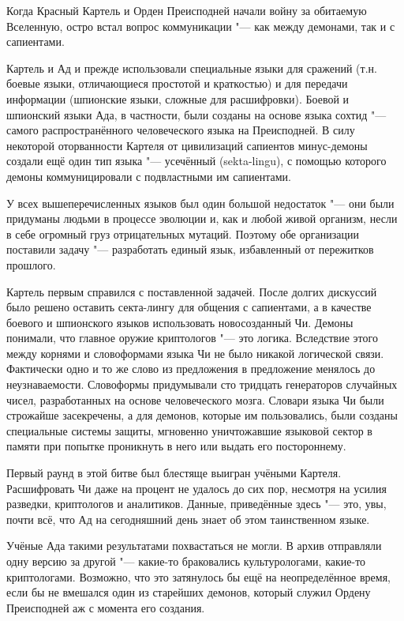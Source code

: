 Когда Красный Картель и Орден Преисподней начали войну за обитаемую Вселенную, остро встал вопрос коммуникации "--- как между демонами, так и с сапиентами.

Картель и Ад и прежде использовали специальные языки для сражений (т.н. боевые языки, отличающиеся простотой и краткостью) и для передачи информации (шпионские языки, сложные для расшифровки).
Боевой и шпионский языки Ада, в частности, были созданы на основе языка сохтид "--- самого распространённого человеческого языка на Преисподней.
В силу некоторой оторванности Картеля от цивилизаций сапиентов минус-демоны создали ещё один тип языка "--- усечённый (sekta-lingu), с помощью которого демоны коммуницировали с подвластными им сапиентами.

У всех вышеперечисленных языков был один большой недостаток "--- они были придуманы людьми в процессе эволюции и, как и любой живой организм, несли в себе огромный груз отрицательных мутаций.
Поэтому обе организации поставили задачу "--- разработать единый язык, избавленный от пережитков прошлого.

Картель первым справился с поставленной задачей.
После долгих дискуссий было решено оставить секта-лингу для общения с сапиентами, а в качестве боевого и шпионского языков использовать новосозданный Чи.
Демоны понимали, что главное оружие криптологов "--- это логика.
Вследствие этого между корнями и словоформами языка Чи не было никакой логической связи.
Фактически одно и то же слово из предложения в предложение менялось до неузнаваемости.
Словоформы придумывали сто тридцать генераторов случайных чисел, разработанных на основе человеческого мозга.
Словари языка Чи были строжайше засекречены, а для демонов, которые им пользовались, были созданы специальные системы защиты, мгновенно уничтожавшие языковой сектор в памяти при попытке проникнуть в него или выдать его постороннему.

Первый раунд в этой битве был блестяще выигран учёными Картеля.
Расшифровать Чи даже на процент не удалось до сих пор, несмотря на усилия разведки, криптологов и аналитиков.
Данные, приведённые здесь "--- это, увы, почти всё, что Ад на сегодняшний день знает об этом таинственном языке.

Учёные Ада такими результатами похвастаться не могли.
В архив отправляли одну версию за другой "--- какие-то браковались культурологами, какие-то криптологами.
Возможно, что это затянулось бы ещё на неопределённое время, если бы не вмешался один из старейших демонов, который служил Ордену Преисподней аж с момента его создания.

